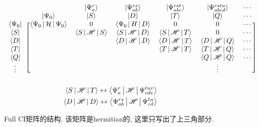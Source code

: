 		\begin{figure}[H]
	\[
	\begin{blockarray}{*{7}{c}}
	&      &\ket{\Psi_a^r} &\ket{\Psi_{ab}^{rs}}  &\ket{\Psi_{abc}^{rst}} & \ket{\Psi_{abcd}^{rstu}} &\cdots\\
	&\ket{\Psi_0}& \ket{S}        &\ket{D}&\ket{T}&\ket{Q}&{\cdots}\\
	\begin{block}{c[cccccc]}
	\bra{\Psi_0}&\braket{\Psi_0|\mathcal{H}|\Psi_0} & 0 & \braket{\Psi_0|H|D} & 0 & 0 & \cdots\\
	\bra{S}& &\braket{S|\hs|S} &\braket{S|\hs|D} & \braket{S|\hs|T} & 0 & \cdots\\
	\bra{D}& && \braket{D|\hs|D}& \braket{D|\hs|T}& \braket{D|\hs|Q}    &\cdots\\
	\bra{T}& && & \braket{T|\hs|T} & \braket{T|\hs|Q} & \cdots\\
	\bra{Q}& & & & &\braket{Q|\hs|Q}&\cdots\\
	{\vdots}&&&&&\vdots\\
	\end{block}	
	\end{blockarray}
	\]
	\vspace{-40pt}
	\begin{align*}
	\Braket{S|\mathscr{H}|T} \leftrightarrow \Braket{\Psi_a^r|\mathscr{H}|\Psi_{cde}^{tuv}}\\
	\Braket{D|\mathscr{H}|D} \leftrightarrow \Braket{\Psi_{ab}^{rs}|\mathscr{H}|\Psi_{cd}^{tu}}\\
	\end{align*}
	\vspace{-30pt}
	\caption{Full CI矩阵的结构. 该矩阵是hermitian的, 这里只写出了上三角部分.}
\end{figure}

